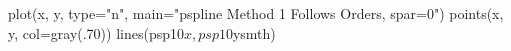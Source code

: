\begin{Schunk}
\begin{Sinput}
 plot(x, y, type="n", main="pspline Method 1 Follows Orders, spar=0")
 points(x, y, col=gray(.70))
 lines(psp10$x, psp10$ysmth)
\end{Sinput}
\end{Schunk}
